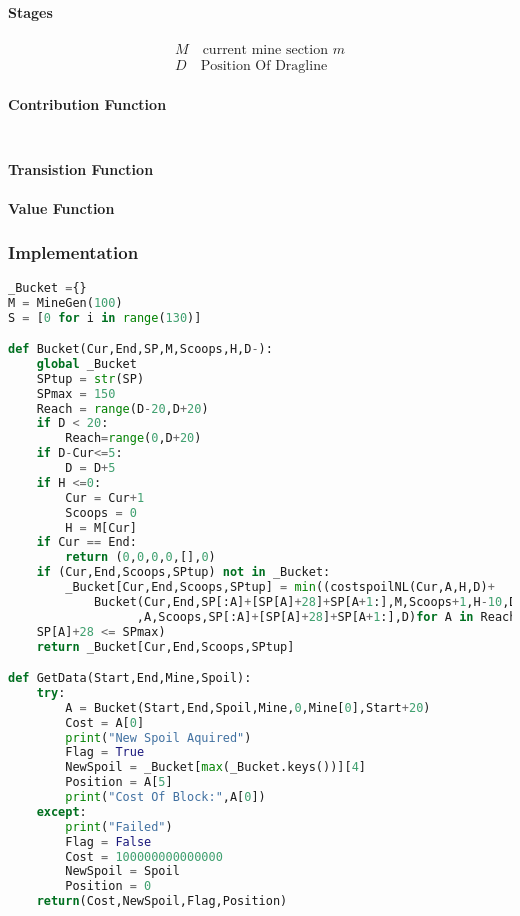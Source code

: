 \paragraph*{Stages}
\begin{align}
\label{DP:Stage1}
M \quad \text{current mine section }m \\ 
\label{DP:stage2}
D \quad \text{Position Of Dragline}
\end{align}
\paragraph*{Contribution Function}
\begin{align}
\label{key}
\end{align}
\paragraph*{Transistion Function}
\paragraph*{Value Function}
\subsubsection{Implementation}
\begin{lstlisting}[language=python]
_Bucket ={}
M = MineGen(100)
S = [0 for i in range(130)]

def Bucket(Cur,End,SP,M,Scoops,H,D-):
    global _Bucket
    SPtup = str(SP)
    SPmax = 150
    Reach = range(D-20,D+20) 
    if D < 20:
        Reach=range(0,D+20) 
    if D-Cur<=5:
        D = D+5
    if H <=0:
        Cur = Cur+1
        Scoops = 0
        H = M[Cur]
    if Cur == End:
        return (0,0,0,0,[],0)
    if (Cur,End,Scoops,SPtup) not in _Bucket:
        _Bucket[Cur,End,Scoops,SPtup] = min((costspoilNL(Cur,A,H,D)+
            Bucket(Cur,End,SP[:A]+[SP[A]+28]+SP[A+1:],M,Scoops+1,H-10,D)[0],Cur\
                  ,A,Scoops,SP[:A]+[SP[A]+28]+SP[A+1:],D)for A in Reach if\
    SP[A]+28 <= SPmax)
    return _Bucket[Cur,End,Scoops,SPtup]

def GetData(Start,End,Mine,Spoil):
    try:
        A = Bucket(Start,End,Spoil,Mine,0,Mine[0],Start+20)
        Cost = A[0]        
        print("New Spoil Aquired")
        Flag = True
        NewSpoil = _Bucket[max(_Bucket.keys())][4]
        Position = A[5]
        print("Cost Of Block:",A[0])
    except:
        print("Failed")
        Flag = False
        Cost = 100000000000000
        NewSpoil = Spoil
        Position = 0
    return(Cost,NewSpoil,Flag,Position)

\end{lstlisting}
